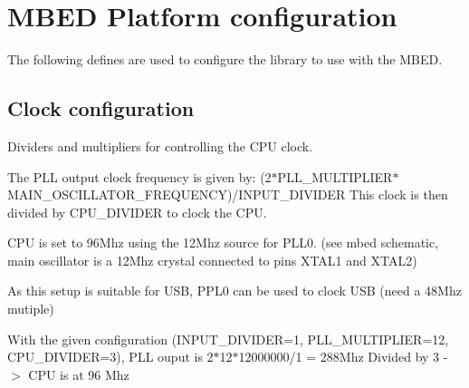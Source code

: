 \hypertarget{group__config}{\section{M\-B\-E\-D Platform configuration}
\label{group__config}
}


The following defines are used to configure the library to use with the M\-B\-E\-D.  


\subsection*{Clock configuration}
\label{_amgrp948b578c3fa1280ed9fcc0cc67547345}%
Dividers and multipliers for controlling the C\-P\-U clock.

The P\-L\-L output clock frequency is given by\-: (2$\ast$\-P\-L\-L\-\_\-\-M\-U\-L\-T\-I\-P\-L\-I\-E\-R$\ast$\-M\-A\-I\-N\-\_\-\-O\-S\-C\-I\-L\-L\-A\-T\-O\-R\-\_\-\-F\-R\-E\-Q\-U\-E\-N\-C\-Y)/\-I\-N\-P\-U\-T\-\_\-\-D\-I\-V\-I\-D\-E\-R This clock is then divided by C\-P\-U\-\_\-\-D\-I\-V\-I\-D\-E\-R to clock the C\-P\-U.

C\-P\-U is set to 96\-Mhz using the 12\-Mhz source for P\-L\-L0. (see mbed schematic, main oscillator is a 12\-Mhz crystal connected to pins X\-T\-A\-L1 and X\-T\-A\-L2)

As this setup is suitable for U\-S\-B, P\-P\-L0 can be used to clock U\-S\-B (need a 48\-Mhz mutiple)

With the given configuration (I\-N\-P\-U\-T\-\_\-\-D\-I\-V\-I\-D\-E\-R=1, P\-L\-L\-\_\-\-M\-U\-L\-T\-I\-P\-L\-I\-E\-R=12, C\-P\-U\-\_\-\-D\-I\-V\-I\-D\-E\-R=3), P\-L\-L ouput is 2$\ast$12$\ast$12000000/1 = 288\-Mhz Divided by 3 -\/$>$ C\-P\-U is at 96 Mhz


